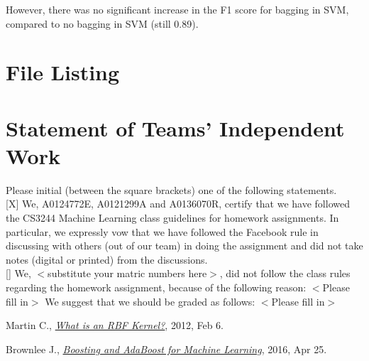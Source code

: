 \documentclass{article}
\begin{document}
However, there was no significant increase in the F1 score for bagging in SVM, compared to no bagging in SVM (still 0.89).

\newpage

\section{File Listing}
\newpage

\section{Statement of Teams' Independent Work}
Please initial (between the square brackets) one of the following statements. \\

[X] We, A0124772E, A0121299A and A0136070R, certify that we have followed the CS3244 Machine Learning class guidelines for homework assignments. In particular, we expressly vow that we have followed the Facebook rule in discussing with others (out of our team) in doing the assignment and did not take notes (digital or printed) from the discussions. \\

[] We, $<$substitute your matric numbers here$>$, did not follow the class rules regarding the homework assignment, because of the following reason: $<$Please fill in$>$
We suggest that we should be graded as follows: $<$Please fill in$>$
\newpage

\begin{thebibliography}{20}
	Martin C.,
	\emph{\href{https://charlesmartin14.wordpress.com/2012/02/06/kernels_part_1/}{What is an RBF Kernel?}},
	2012, Feb 6.
	
	Brownlee J.,
	\emph{\href{http://machinelearningmastery.com/boosting-and-adaboost-for-machine-learning/}{Boosting and AdaBoost for Machine Learning}},
	2016, Apr 25.
\end{thebibliography}
\end{document}
